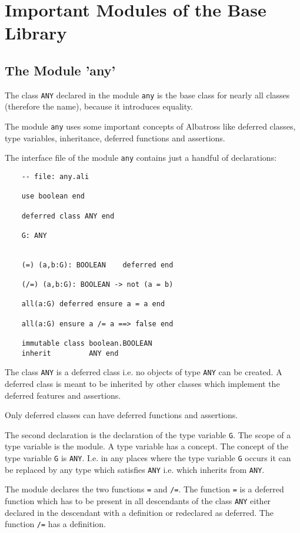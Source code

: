 \section{Important Modules of the Base Library}

\subsection{The Module 'any'}

The class \lstinline!ANY! declared in the module \lstinline!any! is the base
class for nearly all classes (therefore the name), because it introduces
equality.

The module \lstinline!any! uses some important concepts of Albatross
like deferred classes, type variables, inheritance, deferred functions and
assertions.

The interface file of the module \lstinline!any! contains just a handful of
declarations:

\begin{lstlisting}
    -- file: any.ali

    use boolean end

    deferred class ANY end

    G: ANY


    (=) (a,b:G): BOOLEAN    deferred end

    (/=) (a,b:G): BOOLEAN -> not (a = b)

    all(a:G) deferred ensure a = a end

    all(a:G) ensure a /= a ==> false end

    immutable class boolean.BOOLEAN
    inherit         ANY end
\end{lstlisting}

The class \lstinline!ANY! is a deferred class i.e. no objects of type
\lstinline!ANY! can be created. A deferred class is meant to be inherited by
other classes which implement the deferred features and assertions.

Only deferred classes can have deferred functions and assertions.

The second declaration is the declaration of the type variable
\lstinline!G!. The scope of a type variable is the module. A type variable has
a concept. The concept of the type variable \lstinline!G! is
\lstinline!ANY!. I.e. in any places where the type variable \lstinline!G!
occurs it can be replaced by any type which satisfies \lstinline!ANY!
i.e. which inherits from \lstinline!ANY!.

The module declares the two functions \lstinline!=! and \lstinline!/=!. The
function \lstinline!=! is a deferred function which has to be present in all
descendants of the class \lstinline!ANY! either declared in the descendant
with a definition or redeclared as deferred. The function \lstinline!/=! has a
definition.

